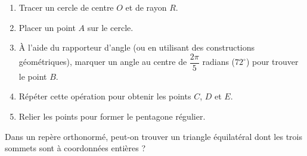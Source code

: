 \documentclass[a4paper,12pt]{article}
\begin{document}
\begin{solutionbox}
\begin{enumerate}
    \begin{enumerate}
        \item Tracer un cercle de centre \( O \) et de rayon \( R \).
        \item Placer un point \( A \) sur le cercle.
        \item À l'aide du rapporteur d'angle (ou en utilisant des constructions géométriques), marquer un angle au centre de \( \dfrac{2\pi}{5} \) radians (\( 72^\circ \)) pour trouver le point \( B \).
        \item Répéter cette opération pour obtenir les points \( C \), \( D \) et \( E \).
        \item Relier les points pour former le pentagone régulier.
    \end{enumerate}

\end{enumerate}
\end{solutionbox}

\begin{tcolorbox}[title={Exercice 17 - {[}Représenter, Calculer, Chercher{]}}]
Dans un repère orthonormé, peut-on trouver un triangle équilatéral dont les trois sommets sont à coordonnées entières ?
\end{tcolorbox}
\end{document}

